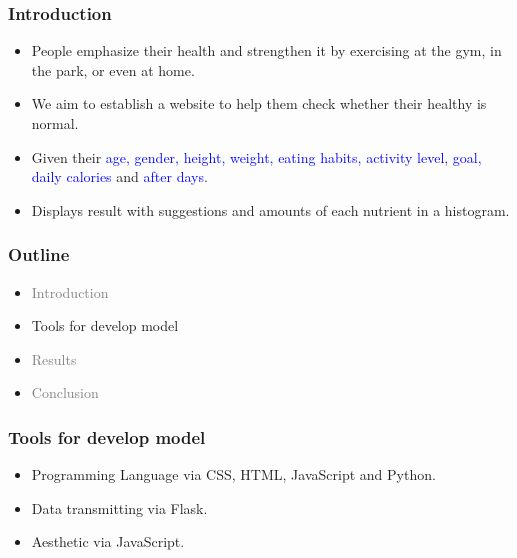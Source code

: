 \documentclass[fleqn]{beamer}
\begin{document}
\begin{frame}
\frametitle{Introduction}
\pause
\begin{itemize}
    \item People emphasize their health and strengthen it by exercising at the gym, in the park, or even at home.
    \vspace{0.15 cm}
    \pause
    \item We aim to establish a website to help them check whether their \alert{healthy} is normal.
    \vspace{0.15 cm}
    \pause
    \item Given their \textcolor{blue}{age, gender, height, weight, eating habits, activity level, goal, daily calories} and \textcolor{blue}{after days}. 
    \vspace{0.15 cm}
    \pause
    \item Displays result with suggestions and amounts of each nutrient in a histogram.
    \vspace{0.15 cm}
\end{itemize}
\end{frame}
\begin{frame}
\frametitle{Outline}
\begin{itemize}
        \item \textcolor{gray}{Introduction}
        \vspace{0.15 cm}
        \item Tools for develop model
        \vspace{0.15 cm}
        \item \textcolor{gray}{Results}
        \vspace{0.15 cm}
        \item \textcolor{gray}{Conclusion}
        \vspace{0.15 cm}
\end{itemize}
\end{frame}
\begin{frame}
\frametitle{Tools for develop model}
\begin{itemize}
    \pause
    \item Programming Language via CSS, HTML, JavaScript and Python. \\
    \vspace{0.15 cm}
    \pause
    \item Data transmitting via Flask. \\
    \vspace{0.15 cm}
    \pause
    \item Aesthetic via JavaScript.
    \vspace{0.15 cm}
\end{itemize}
\end{frame}
\end{document}
